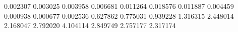 0.002307
0.003025
0.003958
0.006681
0.011264
0.018576
0.011887
0.004459
0.000938
0.000677
0.002536
0.627862
0.775031
0.939228
1.316315
2.448014
2.168047
2.792020
4.104114
2.849749
2.757177
2.317174

